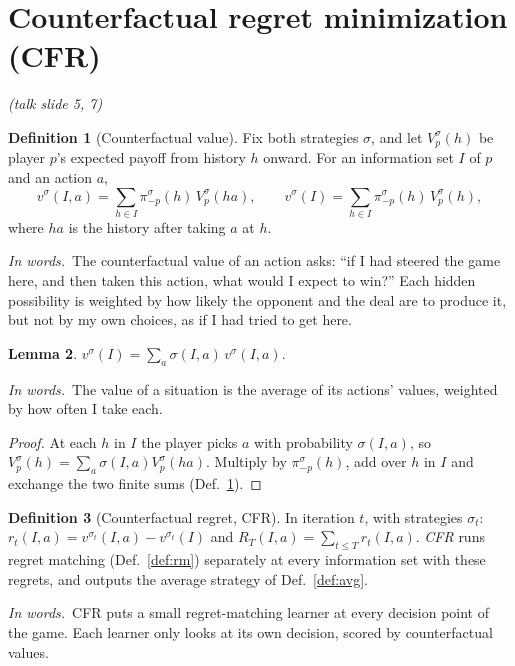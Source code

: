 \documentclass[11pt]{article}
\theoremstyle{definition}
\newtheorem{definition}{Definition}[section]
\newtheorem{lemma}[definition]{Lemma}
\newcommand{\inwords}{\par\smallskip\noindent\textit{In words.}\ }
\newcommand{\Def}[1]{Def.~\ref{#1}}\newcommand{\Lem}[1]{Lemma~\ref{#1}}\newcommand{\Thm}[1]{Thm.~\ref{#1}}
\newcommand{\slide}[1]{\hfill{\small\itshape (talk slide #1)}}
\begin{document}
\section{Counterfactual regret minimization (CFR)}\label{sec:cfr}\slide{5, 7}
\begin{definition}[Counterfactual value]\label{def:cfv}
Fix both strategies $\sigma$, and let $V^\sigma_p(h)$ be player $p$'s expected payoff from history $h$ onward. For an
information set $I$ of $p$ and an action $a$,
\[ v^\sigma(I,a)=\sum_{h\in I}\pi_{-p}^\sigma(h)\,V^\sigma_p(ha),\qquad v^\sigma(I)=\sum_{h\in I}\pi_{-p}^\sigma(h)\,V^\sigma_p(h), \]
where $ha$ is the history after taking $a$ at $h$.
\inwords The counterfactual value of an action asks: ``if I had steered the game here, and then taken this action, what
would I expect to win?'' Each hidden possibility is weighted by how likely the opponent and the deal are to produce it,
but not by my own choices, as if I had tried to get here.
\end{definition}

\begin{lemma}\label{lem:cfvmix}
$v^\sigma(I)=\sum_a\sigma(I,a)\,v^\sigma(I,a)$.
\inwords The value of a situation is the average of its actions' values, weighted by how often I take each.
\end{lemma}
\begin{proof}
At each $h$ in $I$ the player picks $a$ with probability $\sigma(I,a)$, so $V^\sigma_p(h)=\sum_a\sigma(I,a)V^\sigma_p(ha)$. Multiply by
$\pi_{-p}^\sigma(h)$, add over $h$ in $I$ and exchange the two finite sums (\Def{def:cfv}).
\end{proof}

\begin{definition}[Counterfactual regret, CFR]\label{def:cfr}
In iteration $t$, with strategies $\sigma_t$: $r_t(I,a)=v^{\sigma_t}(I,a)-v^{\sigma_t}(I)$ and $R_T(I,a)=\sum_{t\le T}r_t(I,a)$. \emph{CFR}
runs regret matching (\Def{def:rm}) separately at every information set with these regrets, and outputs the average
strategy of \Def{def:avg}.
\inwords CFR puts a small regret-matching learner at every decision point of the game. Each learner only looks at its own
decision, scored by counterfactual values.
\end{definition}
\end{document}
